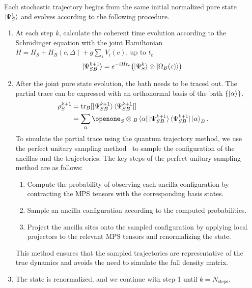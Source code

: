 \documentclass[aps,pra,twocolumn,superscriptaddress,nolongbibliography,nobalancelastpage,10pt]{revtex4-2}
\begin{document}
Each stochastic trajectory begins from the same initial normalized pure state $\ket{\Psi_S^1}$ and evolves according to the following procedure.
\begin{enumerate}
	\item At each step $k$, calculate the coherent time evolution according to the Schr\"{o}dinger equation with the joint Hamiltonian \(H=H_S+H_B(c,\Delta)+g\sum_i V_i(c)\), up to $t_e$
	      \begin{equation}
		      \ket{\Psi_{SB}^{k+1}} =
		      e^{-iHt_e} \bigl(\ket{\Psi_{S}^{k}} \otimes \ket{\Omega_B(c)}\bigr).
		      \label{eq:dynamics}
	      \end{equation}
	\item After the joint pure state evolution, the bath needs to be traced out. The partial trace can be expressed with an orthonormal basis of the bath $\{\ket{\alpha}\}$,
	      \begin{equation}
		      \begin{aligned}
			      \rho_S^{k+1} & = {\tr}_B [ \ket{\Psi_{SB}^{k+1}}\bra{\Psi_{SB}^{k+1}} ]                                                   \\
			                   & =  \sum_{\alpha}\Id_S \otimes {}_B\bra{\alpha}\ket{\Psi_{SB}^{k+1}} \bra{\Psi_{SB}^{k+1}}  \ket{\alpha}_B.
		      \end{aligned}
	      \end{equation}
	      To simulate the partial trace using the quantum trajectory method, we use the perfect unitary sampling method~\cite{Ferris2012Perfect} to sample the configuration of the ancillas and the trajectories. The key steps of the perfect unitary sampling method are as follows:
	      \begin{enumerate}
		      \item Compute the probability of observing each ancilla configuration by contracting the MPS tensors with the corresponding basis states.
		      \item Sample an ancilla configuration according to the computed probabilities.
		      \item Project the ancilla sites onto the sampled configuration by applying local projectors to the relevant MPS tensors and renormalizing the state.
	      \end{enumerate}
	      This method ensures that the sampled trajectories are representative of the true dynamics and avoids the need to simulate the full density matrix.
	\item The state is renormalized, and we continue with step 1 until $k = N_\text{steps}$.
\end{enumerate}
\end{document}
